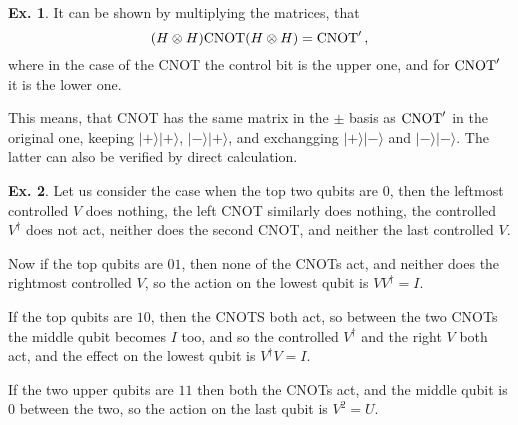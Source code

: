 \documentclass[a4paper,12pt]{article}
\theoremstyle{definition}
\newtheorem{exercise}{Ex.}[section]
\begin{document}
\begin{exercise}
 It can be shown by multiplying the matrices, that
 \[
  (H\otimes H) {\rm CNOT}(H\otimes H) = {\rm CNOT}'\,,
 \]
 where in the case of the CNOT the control bit is the upper one, and for ${\rm CNOT}'$ it is the lower one.
 
 This means, that CNOT has the same matrix in the $\pm$ basis as ${\rm CNOT}'$ in the original one, keeping $|+\rangle|+\rangle$, $|-\rangle|+\rangle$, and exchangging $|+\rangle|-\rangle$ and $|-\rangle|-\rangle$. The latter can also be verified by direct calculation.
\end{exercise}

\begin{exercise}
 Let us consider the case when the top two qubits are 0, then the leftmost controlled $V$ does nothing, the left CNOT similarly does nothing, the controlled $V^\dagger$ does not act, neither does the second CNOT, and neither the last controlled $V$.
 
 Now if the top qubits are $01$, then none of the CNOTs act, and neither does the rightmost controlled $V$, so the action on the lowest qubit is $VV^\dagger = I$.
 
 If the top qubits are $10$, then the CNOTS both act, so between the two CNOTs the middle qubit becomes $I$ too, and so the controlled $V^\dagger$ and the right $V$ both act, and the effect on the lowest qubit is $V^\dagger V=I$.
 
 If the two upper qubits are $11$ then both the CNOTs act, and the middle qubit is 0 between the two, so the action on the last qubit is $V^2=U$.
\end{exercise}
\end{document}
